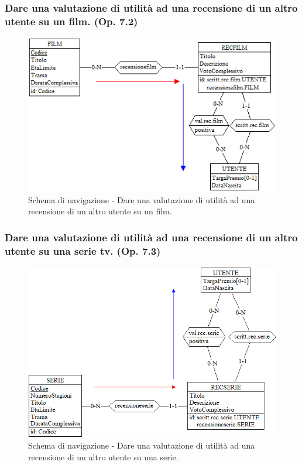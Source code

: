 \documentclass[a4paper,12pt]{report}
\begin{document}
	\subsubsection{Dare una valutazione di utilità ad una recensione di un altro utente su un film. (Op. 7.2)}
	\begin{figure}[H]
		\centering
		\includegraphics[width=450pt]{ER/navigazione/valutazionerecfilm.png}
		\caption{Schema di navigazione - Dare una valutazione di utilità ad una recensione di un altro utente su un film.}
	\end{figure}
	
	\subsubsection{Dare una valutazione di utilità ad una recensione di un altro utente su una serie tv. (Op. 7.3)}
	\begin{figure}[H]
		\centering
		\includegraphics[width=450pt]{ER/navigazione/valutazionerecserie.png}
		\caption{Schema di navigazione - Dare una valutazione di utilità ad una recensione di un altro utente su una serie.}
	\end{figure}
	
\end{document}
